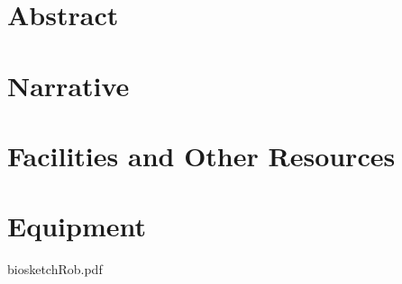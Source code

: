 \documentclass[11pt]{report}
\begin{document}
\thispagestyle{empty}  %

\newpage

\tableofcontents
\newpage

\section{Abstract} 

\newpage

\section{Narrative}

\newpage


% 


\newpage

\section{Facilities and Other Resources} 

\newpage

\section{Equipment}

\newpage


\newpage

% 

{biosketchRob.pdf}

\newpage
\end{document}
